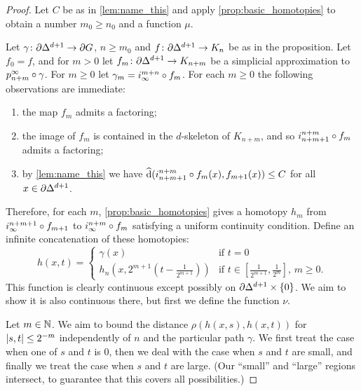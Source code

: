 \documentclass[a4paper]{article}
\begin{document}
\begin{proof}
  Let $C$ be as in \cref{lem:name_this} and apply \cref{prop:basic_homotopies}
  to obtain a number $m_0\geq n_0$ and a function $\mu$. 
  
  Let $\gamma\colon\partial\Delta^{d+1}\to\partial G$, $n\geq m_0$ and
  $f\colon\partial\Delta^{d+1}\to K_n$ be as in the proposition. Let $f_0 = f$,
  and for $m > 0$ let $f_m\colon\partial\Delta^{d+1}\to K_{n+m}$ be a
  simplicial approximation to $p^\infty_{n+m}\circ\gamma$. For $m \geq 0$
  let $\gamma_m = i^{m+n}_\infty\circ f_m$. For each $m\geq 0$ the
  following observations are immediate:
  \begin{enumerate}
    \item the map $f_m$ admits a factoring;
    \item the image of $f_m$ is contained in the $d$-skeleton of $K_{n+m}$, and
      so $i^{n+m}_{n+m+1}\circ f_m$ admits a factoring;
    \item by \cref{lem:name_this} we have $\operatorname{\widehat{d}}(i^{n+m}_{n+m+1}\circ
      f_m(x), f_{m+1}(x)) \leq C$ for all $x \in \partial\Delta^{d+1}$.
  \end{enumerate}
  Therefore, for each $m$, \cref{prop:basic_homotopies} gives a homotopy $h_m$
  from $i^{n+m+1}_\infty\circ f_{m+1}$ to $i^{n+m}_\infty \circ f_m$
  satisfying a uniform continuity condition. Define an infinite concatenation
  of these homotopies:
  \begin{equation*}
    h(x,t) = 
    \begin{cases}
      \gamma(x) & \text{if } t = 0\\
      h_n\left(x,2^{m+1}\left(t-\frac{1}{2^{m+1}}\right)\right) 
              & \text{if $t \in \left[\frac{1}{2^{m+1}}, \frac{1}{2^m}\right]$
                    , $m\geq 0$}.
    \end{cases}
  \end{equation*}
  This function is clearly continuous except possibly on
  $\partial\Delta^{d+1}\times\{0\}$. We aim to show it is also continuous
  there, but first we define the function $\nu$. 

  Let $m \in \mathbb{N}$. We aim to bound the distance $\rho(h(x,s), h(x,t))$
  for $\left|s,t\right| \leq 2^{-m}$ independently of $n$ and the particular path
  $\gamma$. We first treat the case when one of $s$ and $t$ is $0$, then we
  deal with the case when $s$ and $t$ are small, and finally we treat the case
  when $s$ and $t$ are large. (Our ``small'' and ``large'' regions intersect,
  to guarantee that this covers all possibilities.)


\end{proof}
\end{document}
